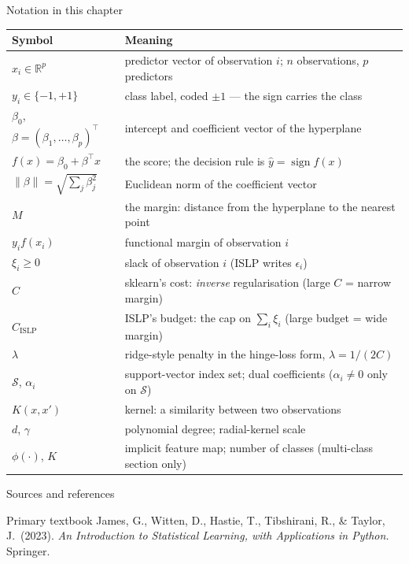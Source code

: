 \documentclass[aspectratio=169,11pt]{beamer}
\begin{document}
\begin{frame}{Notation in this chapter}
  \scriptsize
  \begin{center}
  \begin{tabular}{@{}ll@{}}
    \toprule
    \textbf{Symbol} & \textbf{Meaning} \\
    \midrule
    $x_i \in \mathbb{R}^p$ & predictor vector of observation $i$; $n$ observations, $p$ predictors \\
    $y_i \in \{-1,+1\}$ & class label, coded $\pm 1$ --- the sign carries the class \\
    $\beta_0$, $\beta=(\beta_1,\dots,\beta_p)^\top$ & intercept and coefficient vector of the hyperplane \\
    $f(x)=\beta_0+\beta^\top x$ & the score; the decision rule is $\hat y = \operatorname{sign} f(x)$ \\
    $\|\beta\|=\sqrt{\sum_j \beta_j^2}$ & Euclidean norm of the coefficient vector \\
    $M$ & the margin: distance from the hyperplane to the nearest point \\
    $y_i f(x_i)$ & functional margin of observation $i$ \\
    $\xi_i \ge 0$ & slack of observation $i$ (ISLP writes $\epsilon_i$) \\
    $C$ & sklearn's cost: \emph{inverse} regularisation (large $C$ = narrow margin) \\
    $C_{\text{ISLP}}$ & ISLP's budget: the cap on $\sum_i \xi_i$ (large budget = wide margin) \\
    $\lambda$ & ridge-style penalty in the hinge-loss form, $\lambda = 1/(2C)$ \\
    $\mathcal{S}$, $\alpha_i$ & support-vector index set; dual coefficients ($\alpha_i\neq0$ only on $\mathcal{S}$) \\
    $K(x,x')$ & kernel: a similarity between two observations \\
    $d$, $\gamma$ & polynomial degree; radial-kernel scale \\
    $\phi(\cdot)$, $K$ & implicit feature map; number of classes (multi-class section only) \\
    \bottomrule
  \end{tabular}
  \end{center}
\end{frame}

\begin{frame}{Sources and references}
  \begin{block}{Primary textbook}
    James, G., Witten, D., Hastie, T., Tibshirani, R., \& Taylor, J.\ (2023).
    \emph{An Introduction to Statistical Learning, with Applications in
    Python.} Springer.
  \end{block}
\end{frame}
\end{document}
